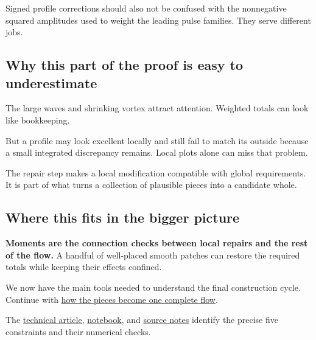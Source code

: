 \documentclass[
  english,
  11pt,
]{article}
\begin{document}
Signed profile corrections should also not be confused with the
nonnegative squared amplitudes used to weight the leading pulse
families. They serve different jobs.

\subsection{Why this part of the proof is easy to
underestimate}\label{why-this-part-of-the-proof-is-easy-to-underestimate}

The large waves and shrinking vortex attract attention. Weighted totals
can look like bookkeeping.

But a profile may look excellent locally and still fail to match its
outside because a small integrated discrepancy remains. Local plots
alone can miss that problem.

The repair step makes a local modification compatible with global
requirements. It is part of what turns a collection of plausible pieces
into a candidate whole.

\subsection{Where this fits in the bigger
picture}\label{where-this-fits-in-the-bigger-picture}

\textbf{Moments are the connection checks between local repairs and the
rest of the flow.} A handful of well-placed smooth patches can restore
the required totals while keeping their effects confined.

We now have the main tools needed to understand the final construction
cycle. Continue with \href{../completing-the-flow/article.html}{how the
pieces become one complete flow}.

The \href{technical-article.html}{technical article},
\href{../../code/d6_moment_correction/study.ipynb}{notebook}, and
\href{source-notes.md}{source notes} identify the precise five
constraints and their numerical checks.
\end{document}
